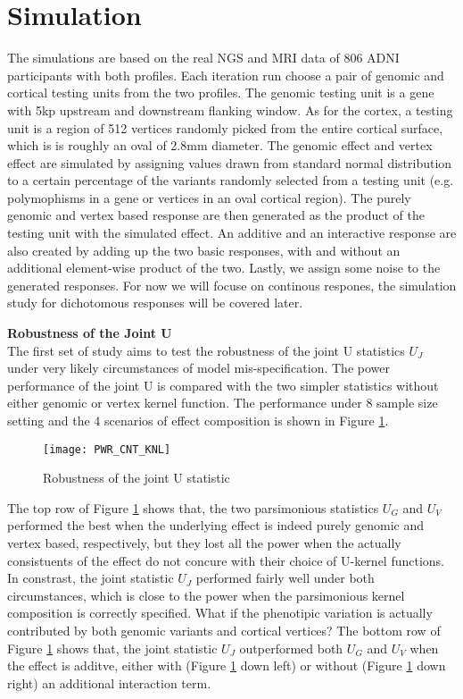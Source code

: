 \section{Simulation}
The simulations are based on the real NGS and MRI data of 806 ADNI participants with both profiles. Each iteration run choose a pair of genomic and cortical testing units from the two profiles. The genomic testing unit is a gene with 5kp upstream and downstream flanking window. As for the cortex, a testing unit is a region of 512 vertices randomly picked from the entire cortical surface, which is is roughly an oval of 2.8mm diameter. The genomic effect and vertex effect are simulated by assigning values drawn from standard normal distribution to a certain percentage of the variants randomly selected from a testing unit (e.g. polymophisms in a gene or vertices in an oval cortical region). The purely genomic and vertex based response are then generated as the product of the testing unit with the simulated effect. An additive and an interactive response are also created by adding up the two basic responses, with and without an additional element-wise product of the two. Lastly, we assign some noise to the generated responses. For now we will focuse on continous respones, the simulation study for dichotomous responses will be covered later.

\noindent\textbf{Robustness of the Joint U} \\
The first set of study aims to test the robustness of the joint U statistics $U_J$ under very likely circumstances of model mis-specification. The power performance of the joint U is compared with the two simpler statistics without either genomic or vertex kernel function. The performance under 8 sample size setting and the 4 scenarios of effect composition is shown in Figure \ref{fig:PWR_CNT_KNL}.
\begin{figure}[!htbp]
\label{fig:PWR_CNT_KNL}
\centering
\texttt{[image: PWR\_CNT\_KNL]}
\caption{Robustness of the joint U statistic}
\end{figure}
The top row of Figure \ref{fig:PWR_CNT_KNL} shows that, the two parsimonious statistics $U_G$ and $U_V$ performed the best when the underlying effect is indeed purely genomic and vertex based, respectively, but they lost all the power when the actually consistuents of the effect do not concure with their choice of U-kernel functions. In constrast, the joint statistic $U_J$ performed fairly well under both circumstances, which is close to the power when the parsimonious kernel composition is correctly specified. What if the phenotipic variation is actually contributed by both genomic variants and cortical vertices? The bottom row of Figure \ref{fig:PWR_CNT_KNL} shows that, the joint statistic $U_J$ outperformed both $U_G$ and $U_V$ when the effect is additve, either with (Figure \ref{fig:PWR_CNT_KNL} down left) or without (Figure \ref{fig:PWR_CNT_KNL} down right) an additional interaction term.

